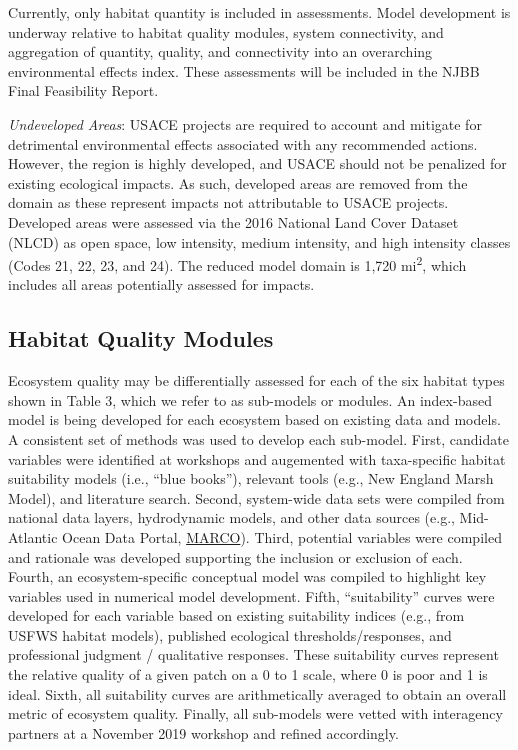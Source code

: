 \documentclass[
]{book}
\begin{document}
Currently, only habitat quantity is included in assessments. Model development is underway relative to habitat quality modules, system connectivity, and aggregation of quantity, quality, and connectivity into an overarching environmental effects index. These assessments will be included in the NJBB Final Feasibility Report.

\emph{Undeveloped Areas}: USACE projects are required to account and mitigate for detrimental environmental effects associated with any recommended actions. However, the region is highly developed, and USACE should not be penalized for existing ecological impacts. As such, developed areas are removed from the domain as these represent impacts not attributable to USACE projects. Developed areas were assessed via the 2016 National Land Cover Dataset (NLCD) as open space, low intensity, medium intensity, and high intensity classes (Codes 21, 22, 23, and 24). The reduced model domain is 1,720 mi\textsuperscript{2}, which includes all areas potentially assessed for impacts.

\hypertarget{habitat-quality-modules}{%
\subsection{Habitat Quality Modules}\label{habitat-quality-modules}}

Ecosystem quality may be differentially assessed for each of the six habitat types shown in Table 3, which we refer to as sub-models or modules. An index-based model is being developed for each ecosystem based on existing data and models. A consistent set of methods was used to develop each sub-model. First, candidate variables were identified at workshops and augemented with taxa-specific habitat suitability models (i.e., ``blue books''), relevant tools (e.g., New England Marsh Model), and literature search. Second, system-wide data sets were compiled from national data layers, hydrodynamic models, and other data sources (e.g., Mid-Atlantic Ocean Data Portal, \href{https://portal.midatlanticocean.org/}{MARCO}). Third, potential variables were compiled and rationale was developed supporting the inclusion or exclusion of each. Fourth, an ecosystem-specific conceptual model was compiled to highlight key variables used in numerical model development. Fifth, ``suitability'' curves were developed for each variable based on existing suitability indices (e.g., from USFWS habitat models), published ecological thresholds/responses, and professional judgment / qualitative responses. These suitability curves represent the relative quality of a given patch on a 0 to 1 scale, where 0 is poor and 1 is ideal. Sixth, all suitability curves are arithmetically averaged to obtain an overall metric of ecosystem quality. Finally, all sub-models were vetted with interagency partners at a November 2019 workshop and refined accordingly.
\end{document}
